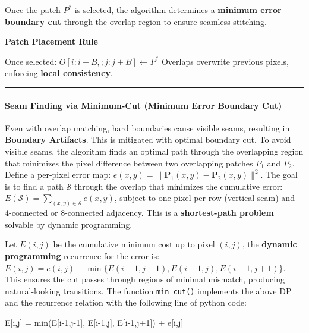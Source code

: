 \documentclass[11pt]{article}
\newenvironment{Shaded}{}{}
\newcommand{\DecValTok}[1]{\textcolor[rgb]{0.25,0.63,0.44}{{#1}}}
\newcommand{\NormalTok}[1]{{#1}}
\newcommand{\OperatorTok}[1]{\textcolor[rgb]{0.40,0.40,0.40}{{#1}}}
\newcommand{\BuiltInTok}[1]{{#1}}
\begin{document}
Once the patch \(P^*\) is selected, the algorithm determines a
\textbf{minimum error boundary cut} through the overlap region to ensure
seamless stitching.

\textbf{Patch Placement Rule}

Once selected: \(O[i : i+B,; j : j+B] \leftarrow P^*\) Overlaps
overwrite previous pixels, enforcing \textbf{local consistency}.

\begin{center}\rule{0.5\linewidth}{0.5pt}\end{center}

\hypertarget{seam-finding-via-minimum-cut-minimum-error-boundary-cut}{%
\paragraph{\texorpdfstring{\textbf{Seam Finding via Minimum-Cut (Minimum
Error Boundary
Cut)}}{Seam Finding via Minimum-Cut (Minimum Error Boundary Cut)}}\label{seam-finding-via-minimum-cut-minimum-error-boundary-cut}}

Even with overlap matching, hard boundaries cause visible seams,
resulting in \textbf{Boundary Artifacts}. This is mitigated with optimal
boundary cut. To avoid visible seams, the algorithm finds an optimal
path through the overlapping region that minimizes the pixel difference
between two overlapping patches \(P_1\) and \(P_2\). Define a per-pixel
error map: \(e(x,y) = \|\mathbf{P}_1(x,y) - \mathbf{P}_2(x,y)\|^2\). The
goal is to find a path \(\mathcal{S}\) through the overlap that
minimizes the cumulative error:
\(E(\mathcal{S}) = \sum\limits_{(x,y)\in\mathcal{S}} e(x,y)\), subject
to one pixel per row (vertical seam) and 4-connected or 8-connected
adjacency. This is a \textbf{shortest-path problem} solvable by dynamic
programming.

Let \(E(i,j)\) be the cumulative minimum cost up to pixel \((i,j)\), the
\textbf{dynamic programming} recurrence for the error is:
\(E(i, j) = e(i, j) + \min \{ E(i-1, j-1), E(i-1, j), E(i-1, j+1) \}\).
This ensures the cut passes through regions of minimal mismatch,
producing natural-looking transitions. The function \texttt{min\_cut()}
implements the above DP and the recurrence relation with the following
line of python code:

\begin{Shaded}
\begin{Highlighting}[]
\NormalTok{E[i,j] }\OperatorTok{=} \BuiltInTok{min}\NormalTok{(E[i}\OperatorTok{{-}}\DecValTok{1}\NormalTok{,j}\OperatorTok{{-}}\DecValTok{1}\NormalTok{], E[i}\OperatorTok{{-}}\DecValTok{1}\NormalTok{,j], E[i}\OperatorTok{{-}}\DecValTok{1}\NormalTok{,j}\OperatorTok{+}\DecValTok{1}\NormalTok{]) }\OperatorTok{+}\NormalTok{ e[i,j]}
\end{Highlighting}
\end{Shaded}
\end{document}
